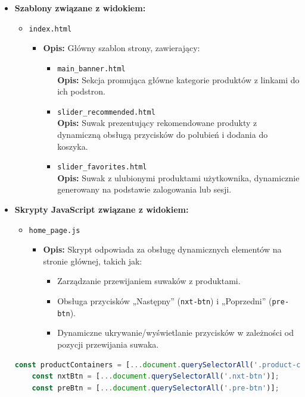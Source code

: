 \documentclass[12pt,a4paper,oneside]{article}
\theoremstyle{definition}
\numberwithin{equation}{section}
\begin{document}
\begin{itemize}
    \item \textbf{Szablony związane z widokiem:}
        \begin{itemize}
            \item {\texttt{index.html}}
                \begin{itemize}
                    \item \textbf{Opis:} Główny szablon strony, zawierający:
                    \begin{itemize}
                        \item {\texttt{main\_banner.html}}\\
                            \textbf{Opis:} Sekcja promująca główne kategorie produktów z linkami do ich podstron.\\
                        \item {\texttt{slider\_recommended.html}}\\
                            \textbf{Opis:} Suwak prezentujący rekomendowane produkty z dynamiczną obsługą przycisków do polubień i dodania do koszyka.\\
                        \item {\texttt{slider\_favorites.html}}\\
                            \textbf{Opis:} Suwak z ulubionymi produktami użytkownika, dynamicznie generowany na podstawie zalogowania lub sesji.
                    \end{itemize}
                \end{itemize}
        \end{itemize}

    \item \textbf{Skrypty JavaScript związane z widokiem:}
        \begin{itemize}
            \item \texttt{home\_page.js}
            \begin{itemize}
                \item \textbf{Opis:} Skrypt odpowiada za obsługę dynamicznych elementów na stronie głównej, takich jak:
                \begin{itemize}
                    \item Zarządzanie przewijaniem suwaków z produktami.
                    \item Obsługa przycisków „Następny” (\texttt{nxt-btn}) i „Poprzedni” (\texttt{pre-btn}).
                    \item Dynamiczne ukrywanie/wyświetlanie przycisków w zależności od pozycji przewijania suwaka.
                \end{itemize}
            \end{itemize}
        \end{itemize}
        \begin{lstlisting}[language=JavaScript, caption=Skrypt home\_page.js]
    const productContainers = [...document.querySelectorAll('.product-container')];
    const nxtBtn = [...document.querySelectorAll('.nxt-btn')];
    const preBtn = [...document.querySelectorAll('.pre-btn')];


\end{lstlisting}
\end{itemize}
\end{document}
